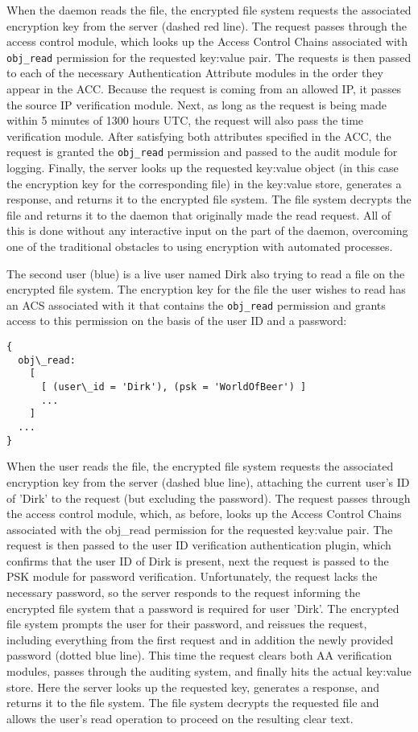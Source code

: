 When the daemon reads the file, the encrypted file system requests the
associated encryption key from the server (dashed red line). The
request passes through the access control module, which looks up the
Access Control Chains associated with \texttt{obj\_read} permission
for the requested key:value pair. The requests is then passed to each
of the necessary Authentication Attribute modules in the order they
appear in the ACC. Because the request is coming from an allowed IP,
it passes the source IP verification module. Next, as long as the
request is being made within 5 minutes of 1300 hours UTC, the request
will also pass the time verification module. After satisfying both
attributes specified in the ACC, the request is granted the
\texttt{obj\_read} permission and passed to the audit module for
logging. Finally, the server looks up the requested key:value object
(in this case the encryption key for the corresponding file) in the
key:value store, generates a response, and returns it to the encrypted
file system. The file system decrypts the file and returns it to the
daemon that originally made the read request. All of this is done
without any interactive input on the part of the daemon, overcoming
one of the traditional obstacles to using encryption with automated
processes.

The second user (blue) is a live user named Dirk also trying to read a
file on the encrypted file system. The encryption key for the file the
user wishes to read has an ACS associated with it that contains the
\texttt{obj\_read} permission and grants access to this permission on
the basis of the user ID and a password:

\begin{verbatim}
{
  obj\_read:
    [
      [ (user\_id = 'Dirk'), (psk = 'WorldOfBeer') ]
      ...
    ]
  ...
}
\end{verbatim}

When the user reads the file, the encrypted file system requests the
associated encryption key from the server (dashed blue line),
attaching the current user's ID of 'Dirk' to the request (but
excluding the password). The request passes through the access control
module, which, as before, looks up the Access Control Chains
associated with the obj\_read permission for the requested key:value
pair. The request is then passed to the user ID verification
authentication plugin, which confirms that the user ID of Dirk is
present, next the request is passed to the PSK module for password
verification. Unfortunately, the request lacks the necessary password,
so the server responds to the request informing the encrypted file
system that a password is required for user 'Dirk'. The encrypted file
system prompts the user for their password, and reissues the request,
including everything from the first request and in addition the newly
provided password (dotted blue line). This time the request clears
both AA verification modules, passes through the auditing system, and
finally hits the actual key:value store. Here the server looks up the
requested key, generates a response, and returns it to the file
system. The file system decrypts the requested file and allows the
user's read operation to proceed on the resulting clear text.

